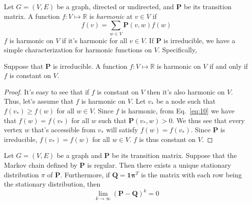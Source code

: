 Let $G = (V,E)$ be a graph, directed or undirected, and $\bm{P}$
be its transition matrix. A function $f \colon V \mapsto \mathbb{R}$
is {\em harmonic} at $v \in V$ if
\begin{equation}
  \label{eq:10}
  f(v) = \sum_{w \in V}{\bm{P}(v,w) f(w)}
\end{equation}
$f$ is harmonic on $V$ if it's harmonic for all $v \in V$. If $\bm{P}$
is irreducible, we have a simple characterization for harmonic
functions on $V$. Specifically,
\begin{lemma}
  \label{lem:1}
  Suppose that $\bm{P}$ is irreducible. A function $f \colon V \mapsto
  \mathbb{R}$ is harmonic on $V$ if and only if $f$ is constant on
  $V$. 
\end{lemma}
\begin{proof}
  It's easy to see that if $f$ is constant on $V$ then it's also
  harmonic on $V$. Thus, let's assume that $f$ is harmonic on $V$.
  Let $v_*$ be a node such that $f(v_*) \geq f(w)$ for all $w \in
  V$. Since $f$ is harmonic, from Eq.~\eqref{eq:10} we have that $f(w)
  = f(v_*)$ for all $w$ such that $\bm{P}(v_*,w) > 0$. We thus see
  that every vertex $w$ that's accessible from $v_*$ will satisfy
  $f(w) = f(v_*)$. Since $\bm{P}$ is irreducible, $f(v_*) = f(w)$ for
  all $w \in V$. $f$ is thus constant on $V$.
\end{proof}

\begin{proposition}
  \label{prop:6}
  Let $G = (V,E)$ be a graph and $\bm{P}$ be its transition
  matrix. Suppose that the Markov chain defined by $\bm{P}$ is
  regular. Then there exists a unique stationary distribution $\pi$ of
  $\bm{P}$. Furthermore, if $\bm{Q} = \bm{1} \bm{\pi}^{T}$ is the
  matrix with each row being the stationary distribution, then
  \begin{equation}
    \label{eq:22}
    \lim_{k \rightarrow \infty}(\bm{P} - \bm{Q})^{k} = 0 
  \end{equation}
\end{proposition}


